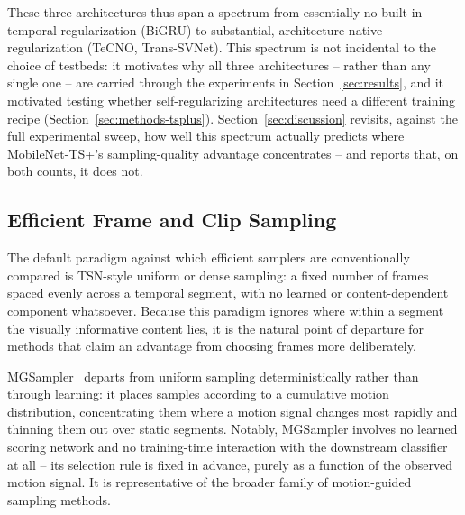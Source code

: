 \documentclass[preprint,12pt]{elsarticle}
\begin{document}
These three architectures thus span a spectrum from essentially no built-in temporal regularization (BiGRU) to substantial, architecture-native regularization (TeCNO, Trans-SVNet). This spectrum is not incidental to the choice of testbeds: it motivates why all three architectures -- rather than any single one -- are carried through the experiments in Section~\ref{sec:results}, and it motivated testing whether self-regularizing architectures need a different training recipe (Section~\ref{sec:methods-tsplus}). Section~\ref{sec:discussion} revisits, against the full experimental sweep, how well this spectrum actually predicts where MobileNet-TS+'s sampling-quality advantage concentrates -- and reports that, on both counts, it does not.

\subsection{Efficient Frame and Clip Sampling}
\label{sec:related-sampling}

The default paradigm against which efficient samplers are conventionally compared is TSN-style uniform or dense sampling: a fixed number of frames spaced evenly across a temporal segment, with no learned or content-dependent component whatsoever. Because this paradigm ignores where within a segment the visually informative content lies, it is the natural point of departure for methods that claim an advantage from choosing frames more deliberately.

MGSampler~\cite{zhi2021mgsampler} departs from uniform sampling deterministically rather than through learning: it places samples according to a cumulative motion distribution, concentrating them where a motion signal changes most rapidly and thinning them out over static segments. Notably, MGSampler involves no learned scoring network and no training-time interaction with the downstream classifier at all -- its selection rule is fixed in advance, purely as a function of the observed motion signal. It is representative of the broader family of motion-guided sampling methods.
\end{document}
